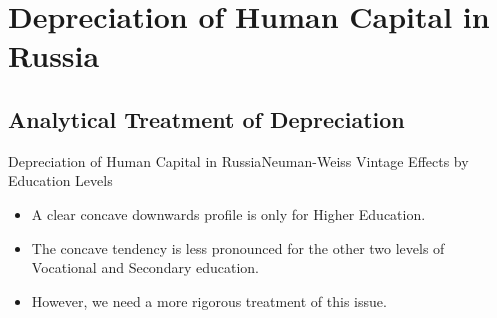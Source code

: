 \documentclass{beamer}
\begin{document}
\section{Depreciation of Human Capital in Russia}
\subsection{Analytical Treatment of Depreciation}

\begin{frame}{Depreciation of Human Capital in Russia}{Neuman-Weiss Vintage Effects by Education Levels}
\begin{figure}
	\centering
	\hfill
	\hfill
\end{figure}
\begin{itemize}
	\item A clear concave downwards profile is only for Higher Education.
	\item The concave tendency is less pronounced for the other two levels of Vocational and Secondary education.
	\item However, we need a more rigorous treatment of this issue.
\end{itemize}
\end{frame}
\end{document}
